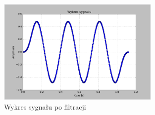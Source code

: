 \documentclass{article}
\begin{document}
{{            \begin{figure}[h!]
                \centering
                \includegraphics[width=0.7\textwidth]{img/fil18.png}
                \caption{Wykres sygnału po filtracji}
            \end{figure}
            \FloatBarrier
        }
        \newpage

}
\end{document}
